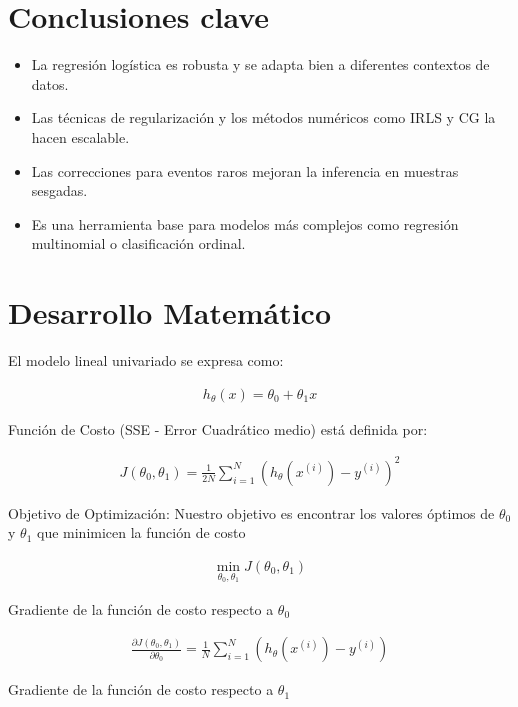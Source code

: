 \documentclass[12pt]{article}
\begin{document}
\section*{Conclusiones clave}
\begin{itemize}
    \item La regresión logística es robusta y se adapta bien a diferentes contextos de datos.
    \item Las técnicas de regularización y los métodos numéricos como IRLS y CG la hacen escalable.
    \item Las correcciones para eventos raros mejoran la inferencia en muestras sesgadas.
    \item Es una herramienta base para modelos más complejos como regresión multinomial o clasificación ordinal.
\end{itemize}

\newpage


\section{Desarrollo Matem\'atico}
El modelo lineal univariado se expresa como:

\begin{eqnarray}
h_\theta(x) = \theta_0 + \theta_1 x
\end{eqnarray}

Función de Costo (SSE - Error Cuadrático medio) está definida por:

\begin{eqnarray}
J(\theta_0, \theta_1) = \frac{1}{2N} \sum_{i=1}^{N} \left( h_\theta(x^{(i)}) - y^{(i)} \right)^2
\end{eqnarray}

Objetivo de Optimización: Nuestro objetivo es encontrar los valores óptimos de $\theta_0$ y $\theta_1$ que minimicen la función de costo

\begin{eqnarray}
\min_{\theta_0, \theta_1} J(\theta_0, \theta_1)
\end{eqnarray}

Gradiente de la función de costo respecto a $\theta_0$

\begin{eqnarray}
\frac{\partial J(\theta_0, \theta_1)}{\partial \theta_0} = \frac{1}{N} \sum_{i=1}^{N} \left( h_\theta(x^{(i)}) - y^{(i)} \right)
\end{eqnarray}

Gradiente de la función de costo respecto a $\theta_1$
\end{document}
